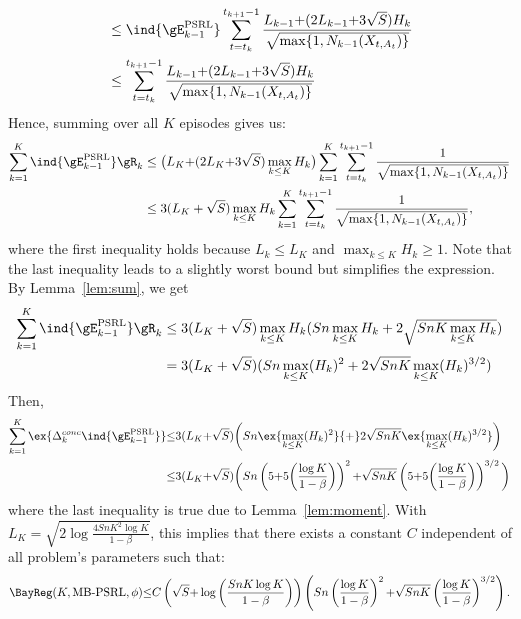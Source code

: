 \begin{subappendices}
\begin{align}
    &\le \ind{\gE_{k-1}^\text{PSRL}} \sum_{t=t_k}^{t_{k+1}-1} \frac{L_{k-1}{+}(2L_{k-1} {+}3\sqrt{S})H_k}{\sqrt{\max\{1,N_{k-1}(X_{t,A_t})\} }} \nonumber\\
    &\le \sum_{t=t_k}^{t_{k+1}-1} \frac{L_{k-1}{+}(2L_{k-1} {+}3\sqrt{S})H_k}{\sqrt{\max\{1,N_{k-1}(X_{t,A_t})\} }} \label{eq:PSRL_R_k}
\end{align}
Hence, summing over all $K$ episodes gives us:
\begin{align}
    \sum_{k=1}^{K} \ind{\gE_{k-1}^\text{PSRL}}\gR_k
    &\le  \big(L_K {+}(2L_K {+}3\sqrt{S})\max_{k\le K}H_k\big)\sum_{k=1}^K \sum_{t=t_k}^{t_{k+1}-1}\frac1{\sqrt{\max\{1,N_{k-1}(X_{t,A_t})\} }}
    \nonumber\\
    &\le  3(L_K+\sqrt{S})\max_{k\le K}H_k \sum_{k=1}^K \sum_{t=t_k}^{t_{k+1}-1}\frac1{\sqrt{\max\{1,N_{k-1}(X_{t,A_t})\} }},
    \label{eq:sum_not_E_k}
\end{align}
where the first inequality holds because $L_k\le L_K$ and $\max_{k\le K}H_k\ge1$. Note that the last inequality leads to a slightly worst bound but simplifies the expression. By Lemma~\ref{lem:sum}, we get
\begin{align*}
    \sum_{k=1}^{K} \ind{\gE_{k-1}^\text{PSRL}}\gR_k
    &\le 3(L_K+\sqrt{S})\max_{k\le K}H_k(Sn\max_{k\le K}H_k +2\sqrt{SnK \max_{k\le K}H_k}) \\
    &=3(L_K+\sqrt{S})(Sn\max_{k\le K}(H_k)^2 +2\sqrt{SnK} \max_{k\le K}(H_k)^{3/2})
    \nonumber
\end{align*}
Then, 
\begin{align}
    \sum_{k=1}^K\ex{\Delta_k^{conc} \ind{\gE_{k-1}^\text{PSRL}}}
    &{\le} 3(L_K {+}\sqrt{S})\bigg(Sn\ex{\max_{k\le K}(H_k)^2} {+}2\sqrt{SnK} \ex{\max_{k\le K}(H_k)^{3/2}}\bigg) \label{eq:proof_bound}\\
    &{\le} 3(L_K {+}\sqrt{S})\bigg(Sn\left(5 {+}5\bigg(\frac{\log K}{1-\beta}\bigg)\right)^2 {+}\sqrt{SnK}\left(5 {+}5\bigg(\frac{\log K}{1-\beta}\bigg)\right)^{3/2}\bigg) \nonumber
\end{align}
where the last inequality is true due to Lemma~\ref{lem:moment}.
With $L_K{=}\sqrt{2\log\frac{4SnK^2\log K}{1-\beta}}$, this implies that there exists a constant $C$ independent of all problem's parameters such that:
\begin{align*}
    \BayReg(K,\text{MB-PSRL},\phi) {\le} C\left(\sqrt{S}{+}\log\left(\frac{SnK\log K}{1-\beta}\right)\right) \left(Sn\left(\frac{\log K}{1-\beta}\right)^{2}
    {+}\sqrt{SnK}\left(\frac{\log K}{1-\beta}\right)^{3/2}\right).
\end{align*}


\end{subappendices}
